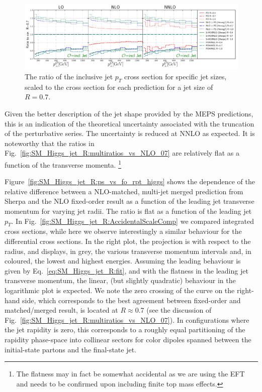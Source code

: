 \documentclass[aps,prd,onecolumn,fleqn,superscriptaddress,groupedaddress,nofootinbib,preprintnumbers,nobalancelastpage]{revtex4}
\begin{document}
\begin{figure}[t]
  \centerline{\includegraphics[width=\textwidth]{plots/Fig_V_18_inclJet.pdf}}
  \caption{The ratio of the inclusive jet $p_T$ cross section 
  for specific jet sizes, scaled to the cross section for
    each prediction for a jet size of
    $R=0.7$.  \label{fig:SM_Higgs_jet_R:multiratios_vs_NLO_07_jet}}
\end{figure}

Given the better description of the jet shape provided by the MEPS predictions,
this is an indication of the theoretical uncertainty associated with the
truncation of the perturbative series. The uncertainty is reduced at NNLO as
expected.  It is noteworthy that the ratios in
Fig.~\ref{fig:SM_Higgs_jet_R:multiratios_vs_NLO_07} are relatively flat as a function of the
transverse momenta.%
\footnote{ The flatness may in fact be somewhat accidental as
we are using the EFT and needs to be confirmed upon including finite top mass
effects.}




Figure~\ref{fig:SM_Higgs_jet_R:ps_vs_fo_rpt_higgs} shows the dependence of the relative
difference between a NLO-matched, multi-jet merged prediction from Sherpa and
the NLO fixed-order result as a function of the leading jet transverse momentum
for varying jet radii.  The ratio is flat as a function of the leading jet
$p_T$.  In Fig.~\ref{fig:SM_Higgs_jet_R:AccidentalScaleComp} we compared integrated cross
sections, while here we observe interestingly a similar behaviour for the
differential cross sections.  In the right plot, the projection is with respect
to the radius,  and displays, in grey, the various transverse momentum intervals
and, in coloured, the lowest and highest energies.  Assuming the leading
behaviour is given by Eq.~\eqref{eq:SM_Higgs_jet_R:fit}, and with the flatness in the leading jet
transverse momentum, the linear, (but slightly quadratic) behaviour in the
logarithmic plot is expected.  We note the zero crossing of the curve on the
right-hand side, which corresponds to the best agreement between fixed-order and
matched/merged result, is located at $R \approx$0.7 (see the discussion of
Fig.~\ref{fig:SM_Higgs_jet_R:multiratios_vs_NLO_07}). In configurations where the jet rapidity
is zero, this corresponds to a roughly equal partitioning of the rapidity
phase-space into collinear sectors for color dipoles spanned between the
initial-state partons and the final-state jet. 
\end{document}
